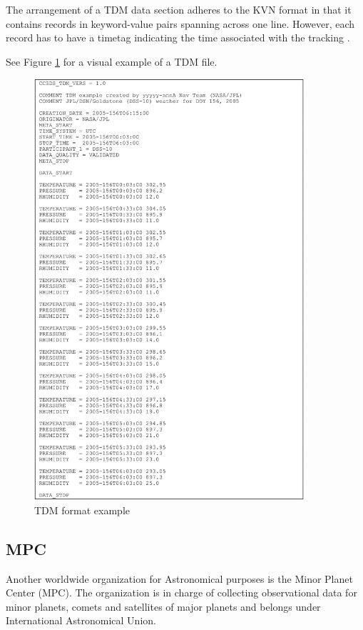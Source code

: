 	The arrangement of a TDM data section adheres to the KVN format in that it contains records in keyword-value pairs spanning across one line. However, each record has to have a timetag indicating the time associated with the tracking \citep{TDMdefinition}.
	
	See Figure \ref{fig:tdm_example} for a visual example of a TDM file.
	
	\begin{figure}[H]
	\centering
	  \includegraphics[width=10cm]{images/tdm_example}
		  \caption{TDM format example}
	  \label{fig:tdm_example}
	\end{figure}
		
\subsection{MPC}\label{sec:mpc}

	Another worldwide organization for Astronomical purposes is the Minor Planet Center (MPC). The organization is in charge of collecting observational data for minor planets, comets and satellites of major planets and belongs under International Astronomical Union.
	
